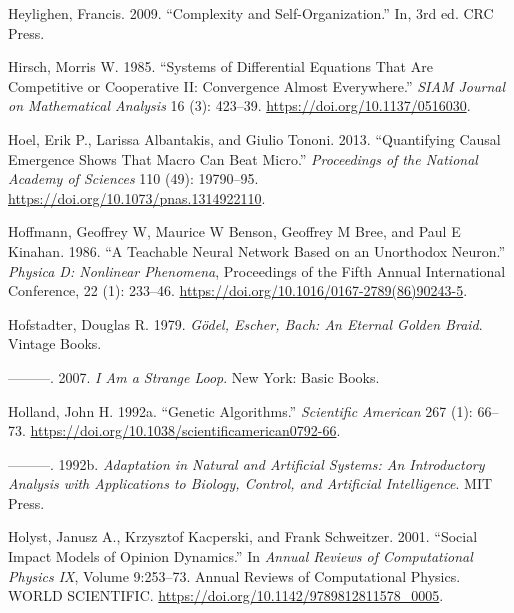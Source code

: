 \documentclass[
  a4paper,
  DIV=11,
  numbers=noendperiod,
  oneside]{scrreprt}
\newlength{\cslhangindent}
\newenvironment{CSLReferences}[2] %
 {\begin{list}{}{%
  \setlength{\itemindent}{0pt}
  \setlength{\leftmargin}{0pt}
  \setlength{\parsep}{0pt}
  \ifodd #1
   \setlength{\leftmargin}{\cslhangindent}
   \setlength{\itemindent}{-1\cslhangindent}
  \fi
  \setlength{\itemsep}{#2\baselineskip}}}
 {\end{list}}
\begin{document}
\begin{CSLReferences}{1}{0}
Heylighen, Francis. 2009. {``Complexity and Self-Organization.''} In,
3rd ed. CRC Press.

Hirsch, Morris W. 1985. {``Systems of {Differential Equations} That Are
{Competitive} or {Cooperative II}: {Convergence Almost Everywhere}.''}
\emph{SIAM Journal on Mathematical Analysis} 16 (3): 423--39.
\url{https://doi.org/10.1137/0516030}.

Hoel, Erik P., Larissa Albantakis, and Giulio Tononi. 2013.
{``Quantifying Causal Emergence Shows That Macro Can Beat Micro.''}
\emph{Proceedings of the National Academy of Sciences} 110 (49):
19790--95. \url{https://doi.org/10.1073/pnas.1314922110}.

Hoffmann, Geoffrey W, Maurice W Benson, Geoffrey M Bree, and Paul E
Kinahan. 1986. {``A Teachable Neural Network Based on an Unorthodox
Neuron.''} \emph{Physica D: Nonlinear Phenomena}, Proceedings of the
{Fifth Annual International Conference}, 22 (1): 233--46.
\url{https://doi.org/10.1016/0167-2789(86)90243-5}.

Hofstadter, Douglas R. 1979. \emph{Gödel, {Escher}, {Bach}: {An Eternal
Golden Braid}}. {Vintage Books}.

---------. 2007. \emph{I Am a Strange Loop}. New York: Basic Books.

Holland, John H. 1992a. {``Genetic {Algorithms}.''} \emph{Scientific
American} 267 (1): 66--73.
\url{https://doi.org/10.1038/scientificamerican0792-66}.

---------. 1992b. \emph{Adaptation in {Natural} and {Artificial
Systems}: {An Introductory Analysis} with {Applications} to {Biology},
{Control}, and {Artificial Intelligence}}. {MIT Press}.

Holyst, Janusz A., Krzysztof Kacperski, and Frank Schweitzer. 2001.
{``Social Impact Models of Opinion Dynamics.''} In \emph{Annual
{Reviews} of {Computational Physics IX}}, Volume 9:253--73. Annual
{Reviews} of {Computational Physics}. {WORLD SCIENTIFIC}.
\url{https://doi.org/10.1142/9789812811578_0005}.


\end{CSLReferences}
\end{document}
